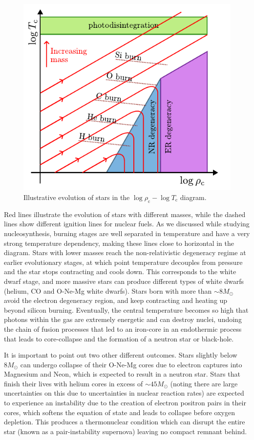 \documentclass[twocolumn]{article}
\begin{document}
\begin{figure}
\centering
\includegraphics{../assets/10_stellar_evo/log_T_rho.pdf}
\caption{Illustrative evolution of stars in the
$\log\rho_{\mathrm{c}}-\log T_{\mathrm{c}}$ diagram.}
\end{figure}

Red lines illustrate the evolution of stars with different masses, while
the dashed lines show different ignition lines for nuclear fuels. As we
discussed while studying nucleosynthesis, burning stages are well
separated in temperature and have a very strong temperature dependency,
making these lines close to horizontal in the diagram. Stars with lower
masses reach the non-relativistic degeneracy regime at earlier
evolutionary stages, at which point temperature decouples from pressure
and the star stops contracting and cools down. This corresponds to the
white dwarf stage, and more massive stars can produce different types of
white dwarfs (helium, CO and O-Ne-Mg white dwarfs). Stars born with more
than \(\sim 8M_\odot\) avoid the electron degeneracy region, and keep
contracting and heating up beyond silicon burning. Eventually, the
central temperature becomes so high that photons within the gas are
extremely energetic and can destroy nuclei, undoing the chain of fusion
processes that led to an iron-core in an endothermic process that leads
to core-collapse and the formation of a neutron star or black-hole.

It is important to point out two other different outcomes. Stars
slightly below \(8M_\odot\) can undergo collapse of their O-Ne-Mg cores
due to electron captures into Magnesium and Neon, which is expected to
result in a neutron star. Stars that finish their lives with helium
cores in excess of \(\sim 45M_\odot\) (noting there are large
uncertainties on this due to uncertainties in nuclear reaction rates)
are expected to experience an instability due to the creation of
electron positron pairs in their cores, which softens the equation of
state and leads to collapse before oxygen depletion. This produces a
thermonuclear condition which can disrupt the entire star (known as a
pair-instability supernova) leaving no compact remnant behind.
\end{document}
